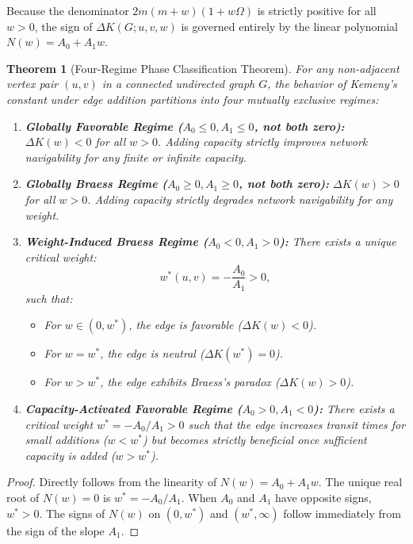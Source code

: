 \documentclass[11pt,a4paper]{article}
\theoremstyle{plain}
\newtheorem{theorem}{Theorem}[section]
\theoremstyle{definition}
\begin{document}
Because the denominator $2m(m+w)(1+w\Omega)$ is strictly positive for all $w > 0$, the sign of $\Delta K(G; u, v, w)$ is governed entirely by the linear polynomial $N(w) = A_0 + A_1 w$.

\begin{theorem}[Four-Regime Phase Classification Theorem]
\label{thm:regimes}
For any non-adjacent vertex pair $(u, v)$ in a connected undirected graph $G$, the behavior of Kemeny's constant under edge addition partitions into four mutually exclusive regimes:
\begin{enumerate}
    \item \textbf{Globally Favorable Regime ($A_0 \le 0, A_1 \le 0$, not both zero):} $\Delta K(w) < 0$ for all $w > 0$. Adding capacity strictly improves network navigability for any finite or infinite capacity.
    \item \textbf{Globally Braess Regime ($A_0 \ge 0, A_1 \ge 0$, not both zero):} $\Delta K(w) > 0$ for all $w > 0$. Adding capacity strictly degrades network navigability for any weight.
    \item \textbf{Weight-Induced Braess Regime ($A_0 < 0, A_1 > 0$):} There exists a unique critical weight:
    \begin{equation}
        w^*(u, v) = -\frac{A_0}{A_1} > 0,
    \end{equation}
    such that:
    \begin{itemize}
        \item For $w \in (0, w^*)$, the edge is favorable ($\Delta K(w) < 0$).
        \item For $w = w^*$, the edge is neutral ($\Delta K(w^*) = 0$).
        \item For $w > w^*$, the edge exhibits Braess's paradox ($\Delta K(w) > 0$).
    \end{itemize}
    \item \textbf{Capacity-Activated Favorable Regime ($A_0 > 0, A_1 < 0$):} There exists a critical weight $w^* = -A_0 / A_1 > 0$ such that the edge increases transit times for small additions ($w < w^*$) but becomes strictly beneficial once sufficient capacity is added ($w > w^*$).
\end{enumerate}
\end{theorem}

\begin{proof}
Directly follows from the linearity of $N(w) = A_0 + A_1 w$. The unique real root of $N(w) = 0$ is $w^* = -A_0 / A_1$. When $A_0$ and $A_1$ have opposite signs, $w^* > 0$. The signs of $N(w)$ on $(0, w^*)$ and $(w^*, \infty)$ follow immediately from the sign of the slope $A_1$.
\end{proof}
\end{document}
